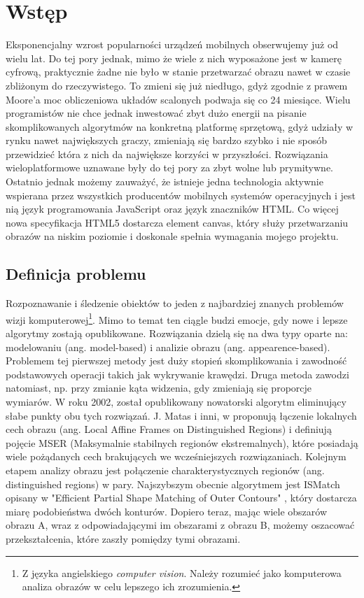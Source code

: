 \chapter{Wstęp}

Eksponencjalny wzrost popularności urządzeń mobilnych obserwujemy już od wielu
lat.  Do tej pory jednak, mimo że wiele z nich wyposażone jest w kamerę
cyfrową, praktycznie żadne nie było w stanie przetwarzać obrazu nawet w czasie
zbliżonym do rzeczywistego. To zmieni się już niedługo, gdyż zgodnie z prawem
Moore'a moc obliczeniowa układów scalonych podwaja się co 24 miesiące.  Wielu
programistów nie chce jednak inwestować zbyt dużo energii na pisanie
skomplikowanych algorytmów na konkretną platformę sprzętową, gdyż udziały w
rynku nawet największych graczy, zmieniają się bardzo szybko i nie sposób
przewidzieć która z nich da największe korzyści w przyszłości. Rozwiązania
wieloplatformowe uznawane były do tej pory za zbyt wolne lub prymitywne.
Ostatnio jednak możemy zauważyć, że istnieje jedna technologia aktywnie
wspierana przez wszystkich producentów mobilnych systemów operacyjnych i jest
nią język programowania JavaScript oraz język znaczników HTML. Co więcej nowa
specyfikacja HTML5 dostarcza element canvas, który służy przetwarzaniu obrazów
na niskim poziomie i doskonale spełnia wymagania mojego projektu.

\section{Definicja problemu}

Rozpoznawanie i śledzenie obiektów to jeden z najbardziej znanych problemów
wizji komputerowej\footnote{Z języka angielskiego \textit{computer vision}.
Należy rozumieć jako komputerowa analiza obrazów w celu lepszego ich
zrozumienia.}. Mimo to temat ten ciągle budzi emocje, gdy nowe i lepsze
algorytmy zostają opublikowane. Rozwiązania dzielą się na dwa typy oparte na:
modelowaniu (ang. model-based) i analizie obrazu (ang. appearence-based).
Problemem tej pierwszej metody jest duży stopień skomplikowania i zawodność
podstawowych operacji takich jak wykrywanie krawędzi. Druga metoda zawodzi
natomiast, np.  przy zmianie kąta widzenia, gdy zmieniają się proporcje
wymiarów.  W roku 2002, został opublikowany nowatorski algorytm eliminujący
słabe punkty obu tych rozwiązań. J. Matas i inni, w \cite{matas02}
proponują łączenie lokalnych cech obrazu (ang. Local Affine Frames on
Distinguished Regions) i definiują pojęcie MSER (Maksymalnie stabilnych
regionów ekstremalnych), które posiadają wiele pożądanych cech brakujących we
wcześniejszych rozwiązaniach.  Kolejnym etapem analizy obrazu jest połączenie
charakterystycznych regionów (ang. distinguished regions) w pary. Najszybszym
obecnie algorytmem jest ISMatch opisany w "Efficient Partial Shape Matching of
Outer Contours" \cite{ismatch}, który dostarcza miarę podobieństwa dwóch
konturów. Dopiero teraz, mając wiele obszarów obrazu A, wraz z odpowiadającymi
im obszarami z obrazu B, możemy oszacować przekształcenia, które zaszły
pomiędzy tymi obrazami.

